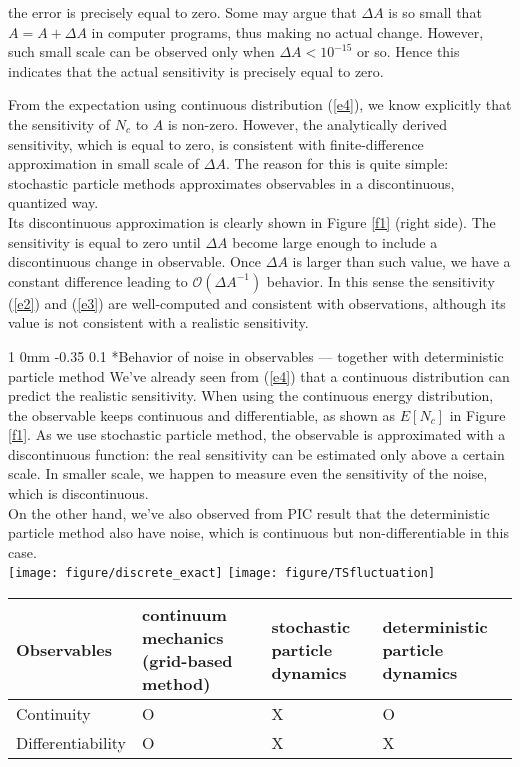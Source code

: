 \documentclass[11pt]{article}
\makeatletter
\renewcommand{\subsection}{\@startsection
{subsection}%
{1}%
{0mm}%
{-0.35\baselineskip}%
{0.1\baselineskip}%
{\normalfont\large\bfseries\color{brown}}}%
\makeatother
\begin{document}
\begin{itemize}
\begin{itemize}
the error is precisely equal to zero.
Some may argue that $\Delta A$ is so small that $A=A+\Delta A$ in computer programs, thus making no actual change.
However, such small scale can be observed only when $\Delta A < 10^{-15}$ or so.
Hence this indicates that the actual sensitivity is precisely equal to zero.
\end{itemize}
From the expectation using continuous distribution (\ref{e4}),
we know explicitly that the sensitivity of $N_c$ to $A$ is non-zero.
However, the analytically derived sensitivity, which is equal to zero, 
is consistent with finite-difference approximation in small scale of $\Delta A$.
The reason for this is quite simple:
stochastic particle methods approximates observables in a discontinuous, quantized way.\\
Its discontinuous approximation is clearly shown in Figure \ref{f1} (right side).
The sensitivity is equal to zero until $\Delta A$ become large enough to include a discontinuous change in observable.
Once $\Delta A$ is larger than such value, we have a constant difference leading to $\mathcal{O}(\Delta A^{-1})$ behavior.
In this sense the sensitivity (\ref{e2}) and (\ref{e3}) are well-computed and consistent with observations,
although its value is not consistent with a realistic sensitivity.
\end{itemize}

\subsection*{Behavior of noise in observables --- together with deterministic particle method}
We've already seen from (\ref{e4}) that a continuous distribution can predict the realistic sensitivity.
When using the continuous energy distribution, the observable keeps continuous and differentiable,
as shown as $E[N_c]$ in Figure \ref{f1}.
As we use stochastic particle method, the observable is approximated with a discontinuous function:
the real sensitivity can be estimated only above a certain scale.
In smaller scale, we happen to measure even the sensitivity of the noise, which is discontinuous.\\
On the other hand, we've also observed from PIC result that the deterministic particle method
also have noise, which is continuous but non-differentiable in this case.\\
\texttt{[image: figure/discrete\_exact]}
\texttt{[image: figure/TSfluctuation]}\\
\begin{tabularx}{\textwidth}{|X|X|X|X|}
\hline
Observables & continuum mechanics (grid-based method) & stochastic particle dynamics & deterministic particle dynamics \\
\hline
Continuity & O & X & O \\
\hline
Differentiability & O & X & X \\
\hline
\end{tabularx}
\end{document}
